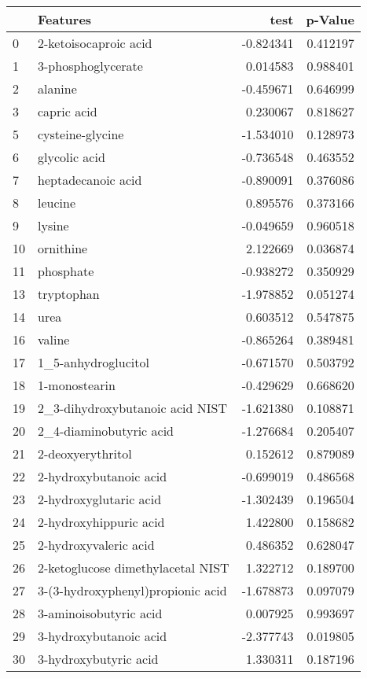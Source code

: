 \begin{tabular}{llrr}
\toprule
 & Features & test & p-Value \\
\midrule
0 & 2-ketoisocaproic acid & -0.824341 & 0.412197 \\
1 & 3-phosphoglycerate & 0.014583 & 0.988401 \\
2 & alanine & -0.459671 & 0.646999 \\
3 & capric acid & 0.230067 & 0.818627 \\
5 & cysteine-glycine & -1.534010 & 0.128973 \\
6 & glycolic acid & -0.736548 & 0.463552 \\
7 & heptadecanoic acid & -0.890091 & 0.376086 \\
8 & leucine & 0.895576 & 0.373166 \\
9 & lysine & -0.049659 & 0.960518 \\
10 & ornithine & 2.122669 & 0.036874 \\
11 & phosphate & -0.938272 & 0.350929 \\
13 & tryptophan & -1.978852 & 0.051274 \\
14 & urea & 0.603512 & 0.547875 \\
16 & valine & -0.865264 & 0.389481 \\
17 & 1_5-anhydroglucitol & -0.671570 & 0.503792 \\
18 & 1-monostearin & -0.429629 & 0.668620 \\
19 & 2_3-dihydroxybutanoic acid NIST & -1.621380 & 0.108871 \\
20 & 2_4-diaminobutyric acid & -1.276684 & 0.205407 \\
21 & 2-deoxyerythritol & 0.152612 & 0.879089 \\
22 & 2-hydroxybutanoic acid & -0.699019 & 0.486568 \\
23 & 2-hydroxyglutaric acid & -1.302439 & 0.196504 \\
24 & 2-hydroxyhippuric acid & 1.422800 & 0.158682 \\
25 & 2-hydroxyvaleric acid & 0.486352 & 0.628047 \\
26 & 2-ketoglucose dimethylacetal NIST & 1.322712 & 0.189700 \\
27 & 3-(3-hydroxyphenyl)propionic acid & -1.678873 & 0.097079 \\
28 & 3-aminoisobutyric acid & 0.007925 & 0.993697 \\
29 & 3-hydroxybutanoic acid & -2.377743 & 0.019805 \\
30 & 3-hydroxybutyric acid & 1.330311 & 0.187196 \\

\end{tabular}
